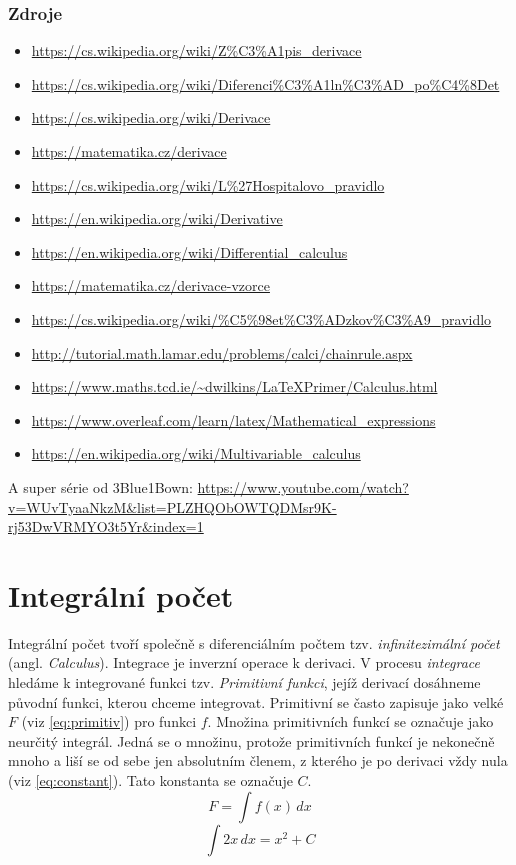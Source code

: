 \documentclass[12pt]{article}
\begin{document}
\subsubsection{Zdroje}
\begin{itemize}
\item \url {https://cs.wikipedia.org/wiki/Z\%C3\%A1pis_derivace}
\item \url{https://cs.wikipedia.org/wiki/Diferenci\%C3\%A1ln\%C3\%AD_po\%C4\%8Det}
\item \url {https://cs.wikipedia.org/wiki/Derivace}
\item \url{https://matematika.cz/derivace}
\item \url{https://cs.wikipedia.org/wiki/L\%27Hospitalovo_pravidlo}
\item \url{https://en.wikipedia.org/wiki/Derivative}
\item \url{https://en.wikipedia.org/wiki/Differential_calculus}
\item \url{https://matematika.cz/derivace-vzorce}
\item \url{https://cs.wikipedia.org/wiki/\%C5\%98et\%C3\%ADzkov\%C3\%A9_pravidlo}
\item \url{http://tutorial.math.lamar.edu/problems/calci/chainrule.aspx}
\item \url{https://www.maths.tcd.ie/~dwilkins/LaTeXPrimer/Calculus.html}
\item \url{https://www.overleaf.com/learn/latex/Mathematical_expressions}
\item \url{https://en.wikipedia.org/wiki/Multivariable_calculus}
\end{itemize}
A super série od 3Blue1Bown: \url{https://www.youtube.com/watch?v=WUvTyaaNkzM&list=PLZHQObOWTQDMsr9K-rj53DwVRMYO3t5Yr&index=1}

\section{Integrální počet}
Integrální počet tvoří společně s diferenciálním počtem  tzv. \emph{infinitezimální počet} (angl. \emph{Calculus}). Integrace je inverzní operace k derivaci. V procesu \emph{integrace} hledáme k integrované funkci tzv. \emph{Primitivní funkci}, jejíž derivací dosáhneme původní funkci, kterou chceme integrovat. Primitivní se často zapisuje jako velké $F$ (viz \ref{eq:primitiv}) pro funkci $f$. Množina primitivních funkcí se označuje jako neurčitý integrál. Jedná se o množinu, protože primitivních funkcí je nekonečně mnoho a liší se od sebe jen absolutním členem, z kterého je po derivaci vždy nula (viz \ref{eq:constant}). Tato konstanta se označuje $C$.
\begin{equation}
\label{eq:primitiv}
F = \int f(x)\,d x
\end{equation}
\begin{equation}
\label{eq:constant}
\int 2x \, dx = x^{2}+ C
\end{equation}
\end{document}
